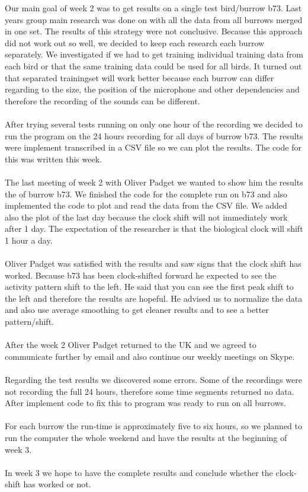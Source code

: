 \documentclass[a4paper]{article}
\begin{document}
Our main goal of week 2 was to get results on a single test bird/burrow b73. Last years group main research was done on with all the data from all burrows merged in one set. The results of this strategy were not conclusive. Because this approach did not work out so well, we decided to keep each research each burrow separately. We investigated if we had to get training individual training data from each bird or that the same training data could be used for all birds. It turned out that separated trainingset will work better because each burrow can differ regarding to the size, the position of the microphone and other dependencies and therefore the recording of the sounds can be different.\\\\
After trying several tests running on only one hour of the recording we decided to run the program on the 24 hours recording for all days of burrow b73. The results were implement transcribed in a CSV file so we can plot the results. The code for this was written this week. \\\\
The last meeting of week 2 with Oliver Padget we wanted to show him the results the of burrow b73. We finished the code for the complete run on b73 and also implemented the code to plot and read the data from the CSV file. 
We added also the plot of the last day because the clock shift will not immediately work after 1 day. The expectation of the researcher is that the biological clock will shift 1 hour a day. \\\\
Oliver Padget was satisfied with the results and saw signs that the clock shift has worked. Because b73 has been clock-shifted forward he expected to see the activity pattern shift to the left. He said that you can see the first peak shift to the left and therefore the results are hopeful. He advised us to normalize the data and also use average smoothing to get cleaner results and to see a better pattern/shift.\\\\
After the week 2 Oliver Padget returned to the UK and we agreed to communicate further by email and also continue our weekly meetings on Skype.\\\\
Regarding the test results we discovered some errors. Some of the recordings were not recording the full 24 hours, therefore some time segments returned no data. After implement code to fix this to program was ready to run on all burrows.\\\\
For each burrow the run-time is approximately five to six hours, so we planned to run the computer the whole weekend and have the results at the beginning of week 3.\\\\
In week 3 we hope to have the complete results and conclude whether the clock-shift has worked or not. 
\end{document}
